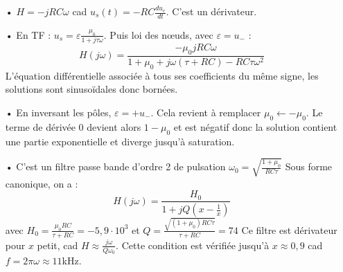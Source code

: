 \documentclass{report}
\begin{document}
\begin{itemize}
	\item[•] $H = -jRC\omega$ cad $u_s(t) = -RC\frac{du_e}{dt}$. C'est un dérivateur.
	\item[•] En TF : $u_s = \varepsilon\frac{\mu_0}{1+j\tau\omega}$. Puis loi des nœuds, avec $\varepsilon=u_-$ :
	\begin{equation}
		H(j\omega) = \frac{-\mu_0jRC\omega}{1+\mu_0 + j\omega(\tau+RC)-RC\tau\omega^2}
	\end{equation}
	L'équation différentielle associée à tous ses coefficients du même signe, les solutions sont sinusoïdales donc bornées. 
	\item[•] En inversant les pôles, $\varepsilon=+u_-$. Cela revient à remplacer $\mu_0\leftarrow-\mu_0$. Le terme de dérivée 0 devient alors $1-\mu_0$ et est négatif donc la solution contient une partie exponentielle et diverge jusqu'à saturation.
	\item[•] C'est un filtre passe bande d'ordre 2 de pulsation $\omega_0=\sqrt{\frac{1+\mu_0}{RC\tau}}$
	Sous forme canonique, on a :
		\begin{equation}
		H(j\omega) = \frac{H_0}{1+jQ(x-\frac{1}{x})}
	\end{equation}
	avec $H_0=\frac{\mu_0RC}{\tau+RC}=-5,9\cdot10^3$ et $Q = \frac{\sqrt{(1+\mu_0)RC\tau}}{\tau+RC}=74$
	Ce filtre est dérivateur pour $x$ petit, cad $H\approx \frac{j\omega}{Q\omega_0}$. Cette condition est vérifiée jusqu'à $x\approx0,9$ cad $f=2\pi\omega\approx11$kHz.
\end{itemize}
\end{document}
